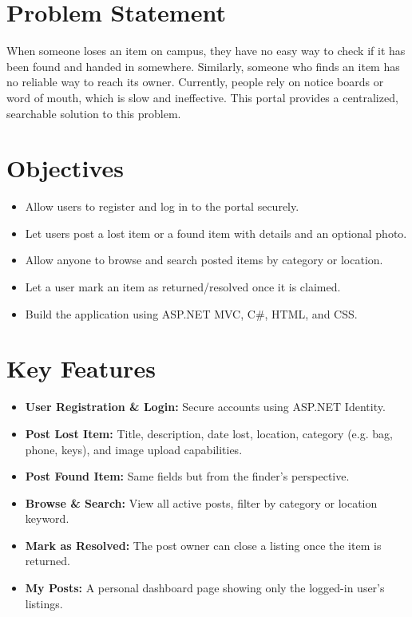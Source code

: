 \documentclass[12pt,a4paper]{report}
\begin{document}
\section{Problem Statement}
When someone loses an item on campus, they have no easy way to check if it has been found and handed in somewhere. Similarly, someone who finds an item has no reliable way to reach its owner. Currently, people rely on notice boards or word of mouth, which is slow and ineffective. This portal provides a centralized, searchable solution to this problem.

\section{Objectives}
\begin{itemize}
    \item Allow users to register and log in to the portal securely.
    \item Let users post a lost item or a found item with details and an optional photo.
    \item Allow anyone to browse and search posted items by category or location.
    \item Let a user mark an item as returned/resolved once it is claimed.
    \item Build the application using ASP.NET MVC, C\#, HTML, and CSS.
\end{itemize}

\section{Key Features}
\begin{itemize}
    \item \textbf{User Registration \& Login:} Secure accounts using ASP.NET Identity.
    \item \textbf{Post Lost Item:} Title, description, date lost, location, category (e.g. bag, phone, keys), and image upload capabilities.
    \item \textbf{Post Found Item:} Same fields but from the finder's perspective.
    \item \textbf{Browse \& Search:} View all active posts, filter by category or location keyword.
    \item \textbf{Mark as Resolved:} The post owner can close a listing once the item is returned.
    \item \textbf{My Posts:} A personal dashboard page showing only the logged-in user's listings.
\end{itemize}
\end{document}
